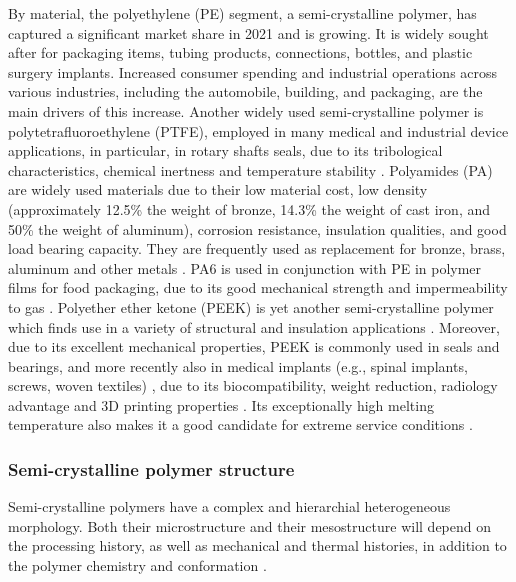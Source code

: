 By material, the polyethylene (PE) segment, a semi-crystalline polymer, has captured a significant market share in 2021 and is growing.
It is widely sought after for packaging items, tubing products, connections, bottles, and plastic surgery implants.
Increased consumer spending and industrial operations across various industries, including the automobile, building, and packaging, are the main drivers of this increase.
Another widely used semi-crystalline polymer is polytetrafluoroethylene (PTFE), employed in many medical and industrial device applications, in particular, in rotary shafts seals, due to its tribological characteristics, chemical inertness and temperature stability \citep{kletschkowskiEndochronicViscoplasticMaterial2002}.
Polyamides (PA) are widely used materials due to their low material cost, low density (approximately 12.5\% the weight of bronze, 14.3\% the weight of cast iron, and 50\% the weight of aluminum),  corrosion resistance, insulation qualities, and good load bearing capacity.
They are frequently used as replacement for bronze, brass, aluminum and other metals \citep{khanThermomechanicalResponseNylon2006}.
PA6 is used in conjunction with PE in polymer films for food packaging, due to its good mechanical strength and impermeability to gas \citep{zengConstitutiveModelSemicrystalline2010}.
Polyether ether ketone (PEEK) is yet another semi-crystalline polymer which finds use in a variety of structural and insulation applications \citep{raeMechanicalPropertiesPoly2007}.
Moreover, due to its excellent mechanical properties, PEEK is commonly used in seals and bearings, and more recently also in medical implants (e.g., spinal implants, screws, woven textiles) \citep{bergstromMechanicsSolidPolymers2015}, due to its biocompatibility, weight reduction, radiology advantage and 3D printing properties \citep{garcia-gonzalezMechanicalImpactBehavior2015}.
Its exceptionally high melting temperature also makes it a good candidate for extreme service conditions \citep{gsellEvolutionMicrostructureSemicrystalline1994}.


\subsubsection{Semi-crystalline polymer structure}

Semi-crystalline polymers have a complex and hierarchial heterogeneous morphology.
Both their microstructure and their mesostructure will depend on the processing history, as well as mechanical and thermal histories, in addition to the polymer chemistry and conformation \citep{khouryMorphologyCrystallineSynthetic1976,cangemiTwoPhaseModelMechanical2001,hoffmanAnalysisRelaxationsPolychlorotrifluoroethylene2007}.

